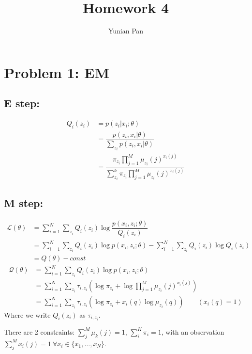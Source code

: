 \documentclass[a4paper,12pt]{article}
\begin{document}
\title{\textbf{Homework 4}}
\author{Yunian Pan}
\maketitle{}


\section{Problem 1: EM}
\subsection{E step:}
\begin{align}
Q_i(z_i) &= p(z_i \rvert x_i ; \theta)  \nonumber \\
& = \dfrac{p(z_i ,  x_i \rvert \theta)}{\sum_{z_i}p(z_i,  x_i \rvert \theta)} \nonumber \\
& = \dfrac{\pi_{z_i} \prod_{j = 1}^{M}\mu_{z_i}(j)^{x_i(j)}}{\sum_{z_i}^{k}\pi_{z_i} \prod_{j = 1}^{M} \mu_{z_i}(j)^{x_i(j)} }\nonumber 
\end{align}

\subsection{M step:}
\begin{align}
\mathcal{L}(\theta) & = \sum_{i = 1}^{N} \sum_{z_i} Q_i(z_i) \log \dfrac{p(x_i , z_i; \theta)}{Q_i(z_i)} \nonumber \\
& = \sum_{i = 1}^{N} \sum_{z_i} Q_i(z_i) \log p(x_i , z_i; \theta) - \sum_{i = 1}^{N} \sum_{z_i} Q_i(z_i) \log Q_i(z_i) \nonumber \\
& = Q(\theta) - const  \nonumber 
\end{align}
\begin{align}
\mathcal{Q}(\theta) & =  \sum_{i = 1}^{N} \sum_{z_i} Q_i(z_i) \log p(x_i , z_i; \theta)\nonumber \\
 & = \sum_{i = 1}^{N} \sum_{z_i}  \tau_{i,z_i} (\log \pi_{z_i} + \log  \prod_{j = 1}^{M}\mu_{z_i}(j)^{x_i(j)})\nonumber \\
 & = \sum_{i = 1}^{N} \sum_{z_i}  \tau_{i,z_i} (\log \pi_{z_i} + x_i(q)\log \mu_{z_i}(q)) \qquad (x_i(q) = 1)\nonumber 
\end{align}
Where we write $Q_i(z_i)$ as $\tau_{i,z_i}$.

There are 2 constraints: $\sum_{j}^{M}\mu_k(j) = 1$, $\sum_{i}^{K}\pi_i = 1$, with an observation $\sum_{j}^{M}x_i(j) = 1 \ \forall x_i \in \{ x_1, \ldots , x_N\}$. 
\end{document}
